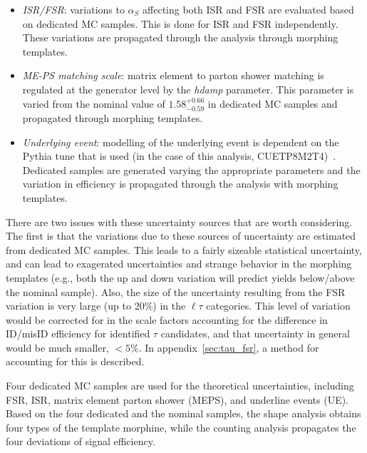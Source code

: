 \begin{itemize}
    \item \textit{ISR/FSR}: variations to $\alpha_{S}$ affecting both
        ISR and FSR are evaluated based on dedicated \ttbar MC samples.
        This is done for ISR and FSR independently.  These variations are
        propagated through the analysis through morphing templates.
    \item \textit{ME-PS matching scale}: matrix element to parton shower
        matching is regulated at the generator level by the \textit{hdamp}
        parameter.  This parameter is varied from the nominal value of
        $1.58^{+0.66}_{-0.59}$ in dedicated MC samples and propagated 
        through morphing templates.
    \item \textit{Underlying event}: modelling of the underlying event
        is dependent on the Pythia tune that is used (in the case of this
        analysis, CUETP8M2T4)~\cite{CMS-PAS-TOP-16-021}.  Dedicated samples
        are generated varying the appropriate parameters and the variation
        in efficiency is propagated through the analysis with morphing
        templates.
\end{itemize}

There are two issues with these uncertainty sources that are worth
considering.  The first is that the variations due to these sources of
uncertainty are estimated from dedicated MC samples.  This leads to a
fairly sizeable statistical uncertainty, and can lead to exagerated
uncertainties and strange behavior in the morphing templates (e.g., both
the up and down variation will predict yields below/above the nominal
sample).  Also, the size of the uncertainty resulting from the FSR
variation is very large (up to 20\%) in the $\ell\tau$ categories.  This
level of variation would be corrected for in the scale factors
accounting for the difference in ID/misID efficiency for identified
$\tau$ candidates, and that uncertainty in general would be much
smaller, $<5\%$.  In appendix~\ref{sec:tau_fsr}, a method for accounting
for this is described.




Four dedicated MC samples are used for the \ttbar theoretical uncertainties,
including FSR, ISR, matrix element parton shower (MEPS), and underline events (UE).
Based on the four dedicated and the nominal \ttbar samples,
the shape analysis obtains four types of the template morphine,
while the counting analysis propagates the four deviations of signal efficiency.

